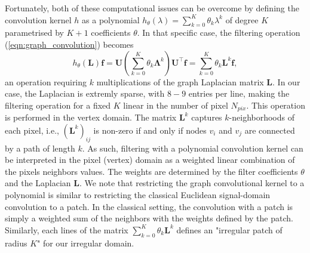 \documentclass[final,twocolumn,3p,times,authoryear]{elsarticle}
\newcommand{\nati}[1]{{\color[rgb]{.1,.6,.1}{#1}}}
\newcommand{\TK}[1]{{\color{red}{TK:#1}}}
\newcommand{\todo}[1]{{\color[rgb]{.6,.1,.6}{#1}}}
\newcommand{\eqnref}[1]{(\ref{eqn:#1})}
\renewcommand{\b}[1]{{\bm{#1}}}   %
\newcommand{\1}{\b{1}}              %
\newcommand{\0}{\b{0}}              %
\renewcommand{\L}{\b{L}}
\newcommand{\U}{\b{U}}
\newcommand{\f}{\b{f}}
\newcommand{\trans}{^\intercal}
\newcommand{\bLambda}{\b{\Lambda}}
\begin{document}
Fortunately, both of these computational issues can be overcome by defining the convolution kernel $h$ as a polynomial $h_\theta(\lambda) = \sum_{k=0}^K \theta_k \lambda^k$ of degree $K$ parametrised by $K+1$ coefficients $\theta$.
In that specific case, the filtering operation \eqnref{graph_convolution} becomes
\begin{equation} \label{eqn:graph_convolution_polynomial}
	h_\theta(\L) \f =  \U \left(\sum_{k=0}^K \theta_k \bLambda^k \right) \U\trans \f = \sum_{k=0}^K \theta_k \L^k \f,
\end{equation}
an operation requiring $k$ multiplications of the graph Laplacian matrix $\L$.
In our case, the Laplacian is extremly sparse, with $8-9$ entries per line, making the filtering operation for a fixed $K$ linear in the number of pixel $N_{pix}$.
This operation is performed in the vertex domain.
The matrix $\L^k$ captures $k$-neighborhoods of each pixel, i.e., $(\L^k)_{ij}$ is non-zero if and only if nodes $v_i$ and $v_j$ are connected by a path of length $k$.
As such, filtering with a polynomial convolution kernel can be interpreted in the pixel (vertex) domain as a weighted linear combination of the pixels neighbors values. The weights are determined by the filter coefficients $\theta$ and the Laplacian $\L$.
We note that restricting the graph convolutional kernel to a polynomial is similar to restricting the classical Euclidean signal-domain convolution to a patch. In the classical setting, the convolution with a patch is simply a weighted sum of the neighbors with the weights defined by the patch. Similarly, each lines of the matrix $\sum_{k=0}^K \theta_k \L^k$ defines an "irregular patch of radius $K$" for our irregular domain.

\end{document}
